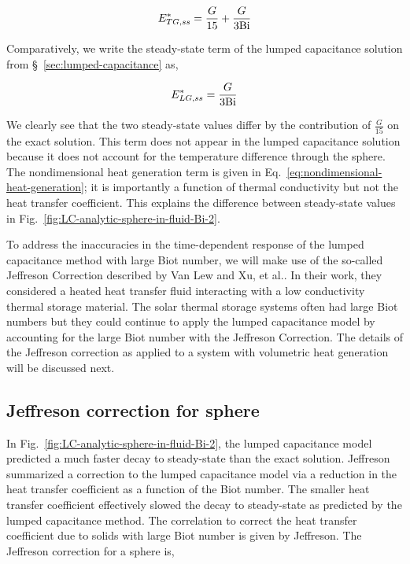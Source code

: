 \begin{equation}
	E^*_{TG,ss}=\frac{G}{15}+\frac{G}{3\mathrm{Bi}}
\end{equation}

Comparatively, we write the steady-state term of the lumped capacitance solution from \S~\ref{sec:lumped-capacitance} as,

\begin{equation}
	E^*_{LG,ss} = \frac{G}{3\mathrm{Bi}}
\end{equation}

We clearly see that the two steady-state values differ by the contribution of $\frac{G}{15}$ on the exact solution. This term does not appear in the lumped capacitance solution because it does not account for the temperature difference through the sphere. The nondimensional heat generation term is given in Eq.~\ref{eq:nondimensional-heat-generation}; it is importantly a function of thermal conductivity but not the heat transfer coefficient. This explains the difference between steady-state values in Fig.~\ref{fig:LC-analytic-sphere-in-fluid-Bi-2}.

To address the inaccuracies in the time-dependent response of the lumped capacitance method with large Biot number, we will make use of the so-called Jeffreson Correction described by Van Lew\cite{VanLew2010} and Xu, et al.\cite{Xu2012}. In their work, they considered a heated heat transfer fluid interacting with a low conductivity thermal storage material. The solar thermal storage systems often had large Biot numbers but they could continue to apply the lumped capacitance model by accounting for the large Biot number with the Jeffreson Correction\cite{jeffreson409}. The details of the Jeffreson correction as applied to a system with volumetric heat generation will be discussed next.





\subsection{Jeffreson correction for sphere}
In Fig.~\ref{fig:LC-analytic-sphere-in-fluid-Bi-2}, the lumped capacitance model predicted a much faster decay to steady-state than the exact solution. Jeffreson summarized a correction to the lumped capacitance model via a reduction in the heat transfer coefficient as a function of the Biot number. The smaller heat transfer coefficient effectively slowed the decay to steady-state as predicted by the lumped capacitance method.
The correlation to correct the heat transfer coefficient due to solids with large Biot number is given by Jeffreson\cite{jeffreson409}. The Jeffreson correction for a sphere is,

